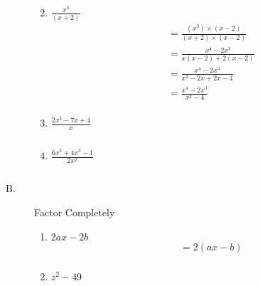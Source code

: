\documentclass{article}
\begin{document}
\begin{description}
\begin{enumerate}
\begin{equation}
\begin{split}
                      \end{split}
                  \end{equation}
            \item $ \frac{x^3} {(x+2)} $
                  \begin{equation}
                      \begin{split}
                          &  = \frac{(x^3) \times (x-2)}{(x+2) \times (x-2)} \\
                          &  = \frac{x^4 - 2x^3}{x(x-2)+2(x-2)} \\
                          &  = \frac{x^4 - 2x^3}{x^2-2x+2x-4} \\
                          &  = \frac{x^4 - 2x^3}{x^2-4} \\
                      \end{split}
                  \end{equation}
            \item $ \frac{2x^3-7x+4}{x}$
                  \begin{equation}
                      \begin{split}
                          & \\
                      \end{split}
                  \end{equation}
            \item $ \frac{6x^5 + 4x^3 - 1}{2x^2}$
                  \begin{equation}
                      \begin{split}
                          & \\
                      \end{split}
                  \end{equation}
        \end{enumerate}
    \item[B. ] Factor Completely
        \begin{enumerate}
            \item $ 2ax - 2b $
                  \begin{equation}
                      \begin{split}
                          & = 2(ax-b)\\
                      \end{split}
                  \end{equation}
            \item $ z^2 - 49 $
                  \begin{equation}

\end{equation}
\end{enumerate}
\end{description}
\end{document}

